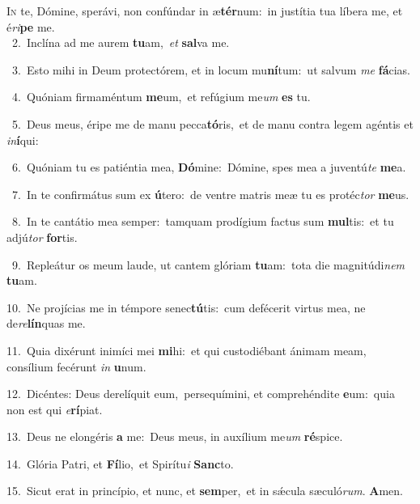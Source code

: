 \lettrine{\initial\textcolor{\initialcolor}{I}}{n} te, Dómine, sperávi, non confúndar in æ\-\textbf{tér}\-num:~\star in justítia tua líbera me, et é\-\textit{ri}\-\textbf{pe} me.\\
{\numbfont\textcolor{\numbcolor}{~2.}}~Inclína ad me aurem \textbf{tu}\-am,~\star \textit{et} \textbf{sal}\-va me.\par
{\numbfont\textcolor{\numbcolor}{~3.}}~Esto mihi in Deum protectórem, et in locum mu\-\textbf{ní}\-tum:~\star ut salvum \textit{me} \textbf{fá}\-cias.\par
{\numbfont\textcolor{\numbcolor}{~4.}}~Quóniam firmaméntum \textbf{me}\-um,~\star et refúgium me\textit{um} \textbf{es} tu.\par
{\numbfont\textcolor{\numbcolor}{~5.}}~Deus meus, éripe me de manu pecca\-\textbf{tó}\-ris,~\star et de manu contra legem agéntis et \textit{in}\-\textbf{í}qui:\par
{\numbfont\textcolor{\numbcolor}{~6.}}~Quóniam tu es patiéntia mea, \textbf{Dó}\-mine:~\star Dómine, spes mea a juventú\textit{te} \textbf{me}\-a.\par
{\numbfont\textcolor{\numbcolor}{~7.}}~In te confirmátus sum ex \textbf{ú}\-tero:~\star de ventre matris meæ tu es protéc\textit{tor} \textbf{me}\-us.\par
{\numbfont\textcolor{\numbcolor}{~8.}}~In te cantátio mea semper:~\dagger tamquam prodígium factus sum \textbf{mul}\-tis:~\star et tu adjú\textit{tor} \textbf{for}\-tis.\par
{\numbfont\textcolor{\numbcolor}{~9.}}~Repleátur os meum laude, ut cantem glóriam \textbf{tu}\-am:~\star tota die magnitúdi\textit{nem} \textbf{tu}\-am.\par
{\numbfont\textcolor{\numbcolor}{10.}}~Ne projícias me in témpore senec\-\textbf{tú}\-tis:~\star cum defécerit virtus mea, ne de\-\textit{re}\-\textbf{lín}quas me.\par
{\numbfont\textcolor{\numbcolor}{11.}}~Quia dixérunt inimíci mei \textbf{mi}\-hi:~\star et qui custodiébant ánimam meam, consílium fecérunt \textit{in} \textbf{u}\-num.\par
{\numbfont\textcolor{\numbcolor}{12.}}~Dicéntes: Deus derelíquit eum,~\dagger persequímini, et comprehéndite \textbf{e}\-um:~\star quia non est qui \textit{e}\-\textbf{rí}piat.\par
{\numbfont\textcolor{\numbcolor}{13.}}~Deus ne elongéris \textbf{a} me:~\star Deus meus, in auxílium me\textit{um} \textbf{ré}\-spice.\par
{\numbfont\textcolor{\numbcolor}{14.}}~Glória Patri, et \textbf{Fí}\-lio,~\star et Spirítu\textit{i} \textbf{Sanc}\-to.\par
{\numbfont\textcolor{\numbcolor}{15.}}~Sicut erat in princípio, et nunc, et \textbf{sem}\-per,~\star et in sǽcula sæculó\-\textit{rum}\-. \textbf{A}\-men.\par
